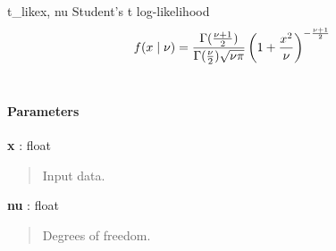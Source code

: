 \hypertarget{pymc.distributions.t_like}{}
\begin{funcdesc}{t\_like}{x, nu}
Student's t log-likelihood
\begin{gather}
\begin{split}f(x \mid \nu) = \frac{\Gamma(\frac{\nu+1}{2})}{\Gamma(\frac{\nu}{2}) \sqrt{\nu\pi}} \left( 1 + \frac{x^2}{\nu} \right)^{-\frac{\nu+1}{2}}\end{split}\notag\\\begin{split}\end{split}\notag
\end{gather}\paragraph{Parameters}\begin{paramlist}

\item[] \textbf{x} : float
\begin{quote}

Input data.
\end{quote}

\item[] \textbf{nu} : float
\begin{quote}

Degrees of freedom.
\end{quote}
\end{paramlist}
\end{funcdesc}

